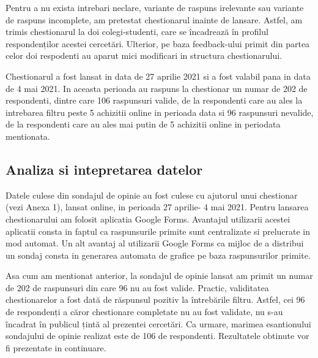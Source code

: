 \documentclass[a4paper, 12pt]{article}
\begin{document}
		\quad Pentru a nu exista intrebari neclare, variante de raspuns irelevante sau variante de raspuns incomplete, am pretestat chestionarul inainte de lansare. Astfel, am trimis chestionarul la doi colegi-studenti, care se încadrează în profilul respondenților acestei cercetări. Ulterior, pe baza feedback-ului primit din partea celor doi respodenti au aparut mici modificari in structura chestionarului.
		
		\quad Chestionarul a fost lansat in data de 27 aprilie 2021 si a fost valabil pana in data de 4 mai 2021. In aceasta perioada au raspuns la chestionar un numar de 202 de respondenti, dintre care 106 raspunsuri valide, de la respondenti care au ales la intrebarea filtru peste 5 achizitii online in perioada data si 96 raspunsuri nevalide, de la respondenti care au ales mai putin de 5 achizitii online in periodata mentionata.
	
		
	\subsection{Analiza si intepretarea datelor}
		\qquad Datele culese din sondajul de opinie au fost culese cu ajutorul unui chestionar (vezi Anexa 1), lansat online, in perioada 27 aprilie- 4 mai 2021. Pentru lansarea chestionarului am folosit aplicatia Google Forms. Avantajul utilizarii acestei aplicatii consta in faptul ca raspunsurile primite sunt centralizate si prelucrate in mod automat. Un alt avantaj al utilizarii Google Forms ca mijloc de a distribui un sondaj consta in generarea automata de grafice pe baza raspunsurilor primite. 
		
		\qquad Asa cum am mentionat anterior, la sondajul de opinie lansat am primit un numar de 202 de raspunsuri din care 96 nu au fost valide. Practic, validitatea chestionarelor a fost dată de răspunsul pozitiv la întrebările filtru. Astfel, cei 96 de respondenți a căror chestionare completate nu au fost validate, nu s-au încadrat în publicul țintă al prezentei cercetări.  Ca urmare, marimea esantionului sondajului de opinie realizat este de 106 de respondenti. Rezultatele obtinute vor fi prezentate in continuare.
		\newline
		
\end{document}
